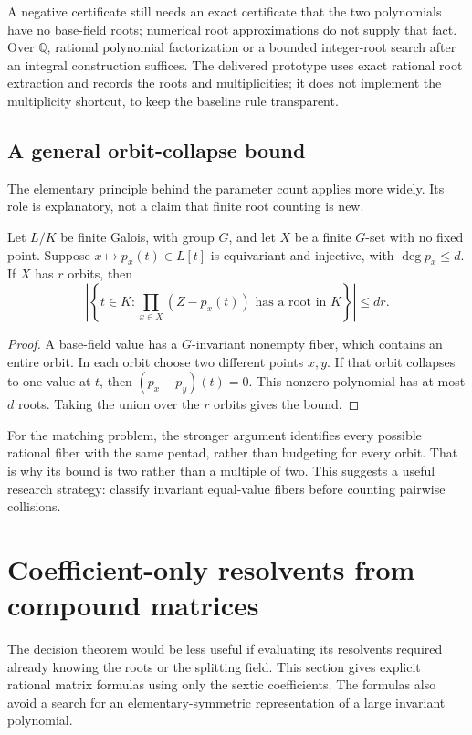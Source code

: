 \documentclass[11pt,letterpaper]{article}
\numberwithin{equation}{section}
\theoremstyle{definition}
\theoremstyle{remark}
\newcommand{\QQ}{\mathbb Q}
\begin{document}
A negative certificate still needs an exact certificate that the two
polynomials have no base-field roots; numerical root approximations do not
supply that fact. Over $\QQ$, rational polynomial factorization or a bounded
integer-root search after an integral construction suffices. The delivered
prototype uses exact rational root extraction and records the roots and
multiplicities; it does not implement the multiplicity shortcut, to keep the
baseline rule transparent.

\subsection{A general orbit-collapse bound}
The elementary principle behind the parameter count applies more widely.
Its role is explanatory, not a claim that finite root counting is new.

\begin{proposition}
\label{tpo:prop:orbit}
Let $L/K$ be finite Galois, with group $G$, and let $X$ be a finite $G$-set
with no fixed point. Suppose $x\mapsto p_x(t)\in L[t]$ is equivariant and
injective, with $\deg p_x\le d$. If $X$ has $r$ orbits, then
\[
 \left|\left\{t\in K:\prod_{x\in X}(Z-p_x(t))\text{ has a root in }K\right\}\right|
 \le dr.
\]
\end{proposition}
\begin{proof}
A base-field value has a $G$-invariant nonempty fiber, which contains an
entire orbit. In each orbit choose two different points $x,y$. If that
orbit collapses to one value at $t$, then $(p_x-p_y)(t)=0$. This nonzero
polynomial has at most $d$ roots. Taking the union over the $r$ orbits gives
the bound.
\end{proof}

For the matching problem, the stronger argument identifies every possible
rational fiber with the same pentad, rather than budgeting for every orbit.
That is why its bound is two rather than a multiple of two. This suggests a
useful research strategy: classify invariant equal-value fibers before
counting pairwise collisions.

\section{Coefficient-only resolvents from compound matrices}
\label{tpo:sec:matrices}

The decision theorem would be less useful if evaluating its resolvents
required already knowing the roots or the splitting field. This section gives
explicit rational matrix formulas using only the sextic coefficients. The
formulas also avoid a search for an elementary-symmetric representation of a
large invariant polynomial.
\end{document}
